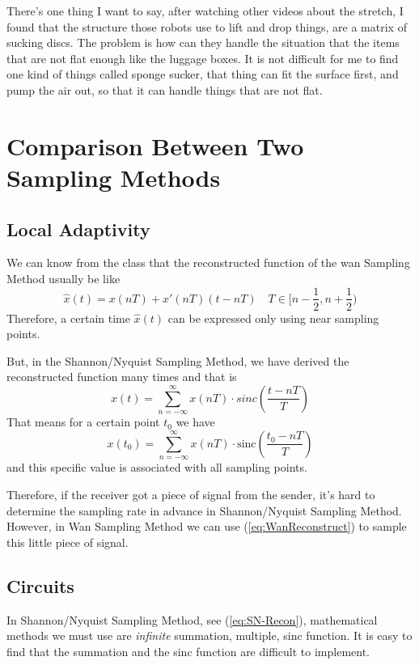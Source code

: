 \documentclass{article}
\begin{document}
There's one thing I want to say, after watching other videos about the stretch, I found that the structure those robots use to lift and drop things, are a matrix of sucking discs. The problem is how can they handle the situation that the items that are not flat enough like the luggage boxes. It is not difficult for me to find one kind of things called sponge sucker, that thing can fit the surface first, and pump the air out, so that it can handle things that are not flat.

\section{Comparison Between Two Sampling Methods}

\subsection{Local Adaptivity}
We can know from the class that the reconstructed function of the wan Sampling Method usually be like
\begin{equation}
	\hat{x}(t) = x(nT) + x'(nT)(t - nT) \quad T \in [n - \frac12, n + \frac12)
	\label{eq:WanReconstruct}
\end{equation}
Therefore, a certain time $\hat{x}(t)$ can be expressed only using near sampling points.

But, in the Shannon/Nyquist Sampling Method, we have derived the reconstructed function many times and that is
\begin{equation}
	x(t) = \sum_{n = - \infty}^{\infty} x(nT) \cdot sinc(\frac{t - nT}{T})
\end{equation}
That means for a certain point $t_0$ we have 
\begin{equation}
	x(t_0) = \sum_{n = - \infty}^{\infty} x(nT) \cdot \mathrm{sinc}(\frac{t_0 - nT}{T})
	\label{eq:SN-Recon}
\end{equation}
and this specific value is associated with all sampling points.

Therefore, if the receiver got a piece of signal from the sender, it's hard to determine the sampling rate in advance in Shannon/Nyquist Sampling Method. However, in Wan Sampling Method we can use (\ref{eq:WanReconstruct}) to sample this little piece of signal.

\subsection{Circuits}
In Shannon/Nyquist Sampling Method, see (\ref{eq:SN-Recon}), mathematical methods we must use are \emph{infinite} summation, multiple, sinc function. It is easy to find that the summation and the sinc function are difficult to implement.
\end{document}
